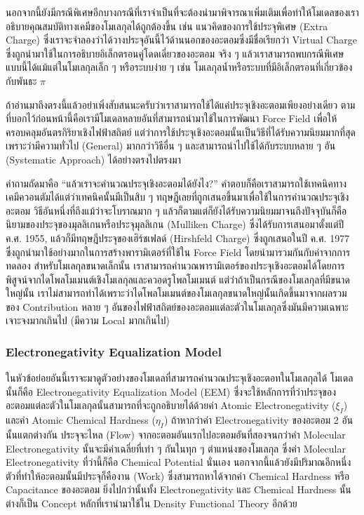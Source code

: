 นอกจากนี้ยังมีกรณีพิเศษอีกบางกรณีที่เราจำเป็นที่จะต้องนำมาพิจารณาเพิ่มเติมเพื่อทำให้โมเดลของเราอธิบายคุณสมบัติทางเคมีของโมเลกุลได้ถูกต้องขึ้น เช่น แนวคิดของการใช้ประจุพิเศษ (Extra Charge) ซึ่งเราจะจำลองว่าได้วางประจุอันนี้ไว้ด้านนอกของอะตอมซึ่งมีชื่อเรียกว่า Virtual Charge ซึ่งถูกนำมาใช้ในการอธิบายอิเล็กตรอนคู่โดดเดี่ยวของอะตอม จริง ๆ แล้วเราสามารถพบกรณีพิเศษแบบนี้ได้แม้แต่ในโมเลกุลเล็ก ๆ หรือระบบง่าย ๆ เช่น โมเลกุลน้ำหรือระบบที่มีอิเล็กตรอนที่เกี่ยวข้องกับพันธะ $\pi$

ถ้าอ่านมาถึงตรงนี้แล้วอย่าเพิ่งสับสนนะครับว่าเราสามารถใช้ได้แค่ประจุเชิงอะตอมเพียงอย่างเดียว ตามที่บอกไว้ก่อนหน้านี้คือเรามีโมเดลหลายอันที่สามารถนำมาใช้ในการพัฒนา Force Field เพื่อให้ครอบคลุมอันตรกิริยาเชิงไฟฟ้าสถิตย์ แต่ว่าการใช้ประจุเชิงอะตอมนั้นเป็นวิธีที่ได้รับความนิยมมากที่สุดเพราะว่ามีความทั่วไป (General) มากกว่าวิธีอื่น ๆ และสามารถนำไปใช้ได้กับระบบหลาย ๆ อัน (Systematic Approach) ได้อย่างตรงไปตรงมา

คำถามถัดมาคือ \enquote{แล้วเราจะคำนวณประจุเชิงอะตอมได้ยังไง?} คำตอบก็คือเราสามารถใช้เทคนิคทางเคมีควอนตัมได้แต่ว่าเทคนิคนั้นมีเป็นสิบ ๆ ทฤษฎีเลยที่ถูกเสนอขึ้นมาเพื่อใช้ในการคำนวณประจุเชิงอะตอม วิธีอันหนึ่งที่ถึงแม้ว่าจะโบราณมาก ๆ แล้วก็ตามแต่ก็ยังได้รับความนิยมมาจนถึงปัจจุบันก็คือนิยามของประจุของมุลลิเกนหรือประจุมุลลิเกน (Mulliken Charge) ซึ่งได้รับการเสนอมาตั้งแต่ปี ค.ศ. 1955, แล้วก็มีทฤษฎีประจุของเฮิร์ชเฟลด์ (Hirshfeld Charge) ซึ่งถูกเสนอในปี ค.ศ. 1977 ซึ่งถูกนำมาใช้อย่างมากในการสร้างพารามิเตอร์ที่ใช้ใน Force Field โดยนำมารวมกันกับค่าจากการทดลอง สำหรับโมเลกุลขนาดเล็กนั้น เราสามารถคำนวณพารามิเตอร์ของประจุเชิงอะตอมได้โดยการพิสูจน์จากไดโพลโมเมนต์เชิงโมเลกุลและควอดรูโพลโมเมนต์ แต่ว่าถ้าเป็นกรณีของโมเลกุลที่มีขนาดใหญ่นั้น เราไม่สามารถทำได้เพราะว่าไดโพลโมเมนต์ของโมเลกุลขนาดใหญ่นั้นเกิดขึ้นมาจากผลรวมของ Contribution หลาย ๆ อันของไฟฟ้าสถิตย์ของอะตอมแต่ละตัวในโมเลกุลซึ่งมันมีความเฉพาะเจาะจงมากเกินไป (มีความ Local มากเกินไป)

\subsubsection{Electronegativity Equalization Model}

ในหัวข้อย่อยอันนี้เราจะมาดูตัวอย่างของโมเดลที่สามารถคำนวณประจุเชิงอะตอทในโมเลกุลได้ โมเดลนั้นก็คือ Electronegativity Equalization Model (EEM) ซึ่งจะใช้หลักการที่ว่าประจุของอะตอมแต่ละตัวในโมเลกุลนั้นสามารถที่จะถูกอธิบายได้ด้วยค่า Atomic Electronegativity ($\xi_{I}$) และค่า Atomic Chemical Hardness ($\eta_{I}$) ถ้าหากว่าค่า Electronegativity ของอะตอม 2 อันนั้นแตกต่างกัน ประจุจะไหล (Flow) จากอะตอมอันแรกไปอะตอมอันที่สองจนกว่าค่า Molecular Electronegativity นั้นจะมีค่าเฉลี่ยที่เท่า ๆ กันในทุก ๆ ตำแหน่งของโมเลกุล\autocite{mortier1986,ionescu2013} ซึ่งค่า Molecular Electronegativity ที่ว่านี้ก็คือ Chemical Potential นั่นเอง นอกจากนี้แล้วยังมีปริมาณอีกหนึ่งตัวที่ทำให้อะตอมนั้นมีประจุก็คืองาน (Work) ซึ่งสามารถหาได้จากค่า Chemical Hardness หรือ Capacitance ของอะตอม ยิ่งไปกว่านั้นทั้ง Electronegativity และ Chemical Hardness นั้นต่างก็เป็น Concept หลักที่เรานำมาใช้ใน Density Functional Theory อีกด้วย\autocite{parr1994a,yang1998}

